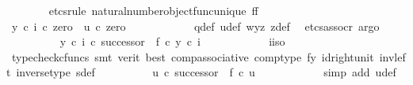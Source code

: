 \begin{isabellebody}
\ \ \ \ \ \ \isamarkupfalse%
\ {\isacharparenleft}{\kern0pt}etcs{\isacharunderscore}{\kern0pt}rule\ natural{\isacharunderscore}{\kern0pt}number{\isacharunderscore}{\kern0pt}object{\isacharunderscore}{\kern0pt}func{\isacharunderscore}{\kern0pt}unique{\isacharbrackleft}{\kern0pt}\ f{\isacharequal}{\kern0pt}f{\isacharbrackright}{\kern0pt}{\isacharparenright}{\kern0pt}\isanewline
\ \ \ \ \ \ \ \ \isamarkupfalse%
\ {\isachardoublequoteopen}{\isacharparenleft}{\kern0pt}y\ {\isasymcirc}\isactrlsub c\ i{\isacharparenright}{\kern0pt}\ {\isasymcirc}\isactrlsub c\ zero\ {\isacharequal}{\kern0pt}\ u\ {\isasymcirc}\isactrlsub c\ zero{\isachardoublequoteclose}\isanewline
\ \ \ \ \ \ \ \ \ \ \isamarkupfalse%
\ q{\isacharunderscore}{\kern0pt}def\ u{\isacharunderscore}{\kern0pt}def\ w{\isacharunderscore}{\kern0pt}y{\isacharunderscore}{\kern0pt}z\ z{\isacharunderscore}{\kern0pt}def\ \isamarkupfalse%
\ {\isacharparenleft}{\kern0pt}etcs{\isacharunderscore}{\kern0pt}assocr{\isacharcomma}{\kern0pt}\ argo{\isacharparenright}{\kern0pt}\isanewline
\ \ \ \ \ \ \ \ \isamarkupfalse%
\ {\isachardoublequoteopen}{\isacharparenleft}{\kern0pt}y\ {\isasymcirc}\isactrlsub c\ i{\isacharparenright}{\kern0pt}\ {\isasymcirc}\isactrlsub c\ successor\ {\isacharequal}{\kern0pt}\ f\ {\isasymcirc}\isactrlsub c\ y\ {\isasymcirc}\isactrlsub c\ i{\isachardoublequoteclose}\isanewline
\ \ \ \ \ \ \ \ \ \ \isamarkupfalse%
\ i{\isacharunderscore}{\kern0pt}iso\ \isamarkupfalse%
\ {\isacharparenleft}{\kern0pt}typecheck{\isacharunderscore}{\kern0pt}cfuncs{\isacharcomma}{\kern0pt}\ smt\ {\isacharparenleft}{\kern0pt}verit{\isacharcomma}{\kern0pt}\ best{\isacharparenright}{\kern0pt}\ comp{\isacharunderscore}{\kern0pt}associative{}\ comp{\isacharunderscore}{\kern0pt}type\ f{\isacharunderscore}{\kern0pt}y\ id{\isacharunderscore}{\kern0pt}right{\isacharunderscore}{\kern0pt}unit{}\ inv{\isacharunderscore}{\kern0pt}left\ inverse{\isacharunderscore}{\kern0pt}type\ s{\isacharunderscore}{\kern0pt}def{\isacharparenright}{\kern0pt}\isanewline
\ \ \ \ \ \ \ \ \isamarkupfalse%
\ {\isachardoublequoteopen}u\ {\isasymcirc}\isactrlsub c\ successor\ {\isacharequal}{\kern0pt}\ f\ {\isasymcirc}\isactrlsub c\ u{\isachardoublequoteclose}\isanewline
\ \ \ \ \ \ \ \ \ \ \isamarkupfalse%
\ {\isacharparenleft}{\kern0pt}simp\ add{\isacharcolon}{\kern0pt}\ u{\isacharunderscore}{\kern0pt}def{\isacharparenright}{\kern0pt}\isanewline
\ \ \ \ \ \ \isamarkupfalse%

\end{isabellebody}
